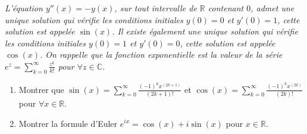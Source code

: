 \documentclass[a4paper,11pt,reqno]{amsart}
\begin{document}
\begin{exo}

  \emph{L'équation $y''(x)=-y(x)$, sur tout intervalle de $\mathbb{R}$ contenant $0$, admet une unique solution qui vérifie les conditions initiales $y(0)=0$ et $y'(0)=1$, cette solution est appelée $\sin(x)$. Il existe également une unique solution qui vérifie les conditions initiales $y(0)=1$ et $y'(0)=0$, cette solution est appelée $\cos(x)$.
  On rappelle que la fonction exponentielle est la valeur de la série $e^{z} = \sum_{k=0}^{\infty}\frac{z^{k}}{k!}$ pour $\forall z \in \mathbb{C}$.}

  \begin{enumerate}
    \item Montrer que $\sin(x)=\sum_{k=0}^{\infty}\frac{(-1)^{k}x^{(2k+1)}}{(2k+1)!}$ et $\cos(x)=\sum_{k=0}^{\infty}\frac{(-1)^{k}x^{(2k)}}{(2k)!}$ pour $\forall x \in \mathbb{R}$.
    \item Montrer la formule d'Euler $e^{ix}=\cos(x) + i\sin(x)$ pour $x\in \mathbb{R}$.
  \end{enumerate}
\end{exo}
\end{document}

